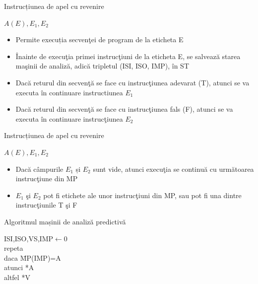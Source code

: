\documentclass[pdf]{beamer}
\begin{document}
\begin{frame}{Instrucțiunea de apel cu revenire}

\begin{center}
$A(E), E_{1}, E_{2}$
\end{center}

\begin{itemize}
\item 
Permite execuția secvenţei de program de la eticheta E

\item 
Înainte de execuţia primei instrucţiuni de la eticheta E, se salvează starea maşinii de analiză, adică tripletul (ISI, ISO, IMP), în ST

\item 
Dacă returul din secvenţă se face cu instrucţiunea adevarat (T), atunci se va executa în continuare instructiunea $E_{1}$

\item 
Dacă returul din secvenţă se face cu instrucţiunea fals (F), atunci se va executa în continuare instrucţiunea $E_{2}$

\end{itemize}
\end{frame}



\begin{frame}{Instrucțiunea de apel cu revenire}

\begin{center}
$A(E), E_{1}, E_{2}$
\end{center}

\begin{itemize}
\item 
Dacă câmpurile $E_{1}$ și $E_{2}$ sunt vide, atunci execuţia se continuă cu următoarea instrucţiune din MP

\item 
$E_{1}$ şi $E_{2}$ pot fi etichete ale unor instrucţiuni din MP, sau pot fi una dintre instrucţiunile T şi F
\end{itemize}
\end{frame}



\begin{frame}{Algoritmul mașinii de analiză predictivă}
\begin{tabbing}
	ISI,ISO,VS,IMP$\leftarrow$0\\
	repeta \=\\
            \> daca \= MP(IMP)=A \+ \\
                 \> atunci *A \\
            altfel *V
\end{tabbing}
\end{frame}
\end{document}
